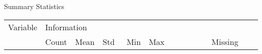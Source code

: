 \begin{threeparttable}
    \caption{Summary Statistics} %
\label{tab:summarystats} %
    \begin{tabular}{ p{0.1\linewidth} p{0.1\linewidth} p{0.1\linewidth} p{0.1\linewidth} p{0.08\linewidth} p{0.3\linewidth} p{0.3\linewidth}}     %
    \toprule %
    Variable                        & \multicolumn{6}{l}{Information} \\ %

                       \cmidrule(r){2-7} %
                                    &    Count   &   Mean & Std & Min & Max & Missing  \\ 
\midrule 


\end{tabular}
\end{threeparttable}
